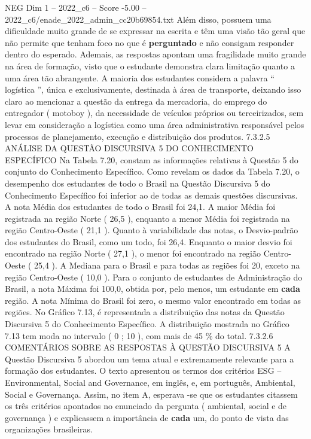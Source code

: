 \begin{textsample}{NEG Dim 1 – 2022\_c6 – Score -5.00 – 2022\_c6/enade\_2022\_admin\_cc20b69854.txt}
Além disso, possuem uma dificuldade muito grande de se expressar na escrita e têm uma visão tão geral que não permite que tenham foco no que é \textbf{perguntado} e não consigam responder dentro do esperado.
Ademais, as respostas apontam uma fragilidade muito grande na área de formação, visto que o estudante demonstra clara limitação quanto a uma área tão abrangente.
A maioria dos estudantes considera a palavra “ logística ”, única e exclusivamente, destinada à área de transporte, deixando isso claro ao mencionar a questão da entrega da mercadoria, do emprego do entregador ( motoboy ), da necessidade de veículos próprios ou terceirizados, sem levar em consideração a logística como uma área administrativa responsável pelos processos de planejamento, execução e distribuição dos produtos. 7.3.2.5 ANÁLISE DA QUESTÃO DISCURSIVA 5 DO CONHECIMENTO ESPECÍFICO Na Tabela 7.20, constam as informações relativas à Questão 5 do conjunto do Conhecimento Específico.
Como revelam os dados da Tabela 7.20, o desempenho dos estudantes de todo o Brasil na Questão Discursiva 5 do Conhecimento Específico foi inferior ao de todas as demais questões discursivas.
A nota Média dos estudantes de todo o Brasil foi 24,1.
A maior Média foi registrada na região Norte ( 26,5 ), enquanto a menor Média foi registrada na região Centro-Oeste ( 21,1 ).
Quanto à variabilidade das notas, o Desvio-padrão dos estudantes do Brasil, como um todo, foi 26,4.
Enquanto o maior desvio foi encontrado na região Norte ( 27,1 ), o menor foi encontrado na região Centro-Oeste ( 25,4 ).
A Mediana para o Brasil e para todas as regiões foi 20, exceto na região Centro-Oeste ( 10,0 ).
Para o conjunto de estudantes de Administração do Brasil, a nota Máxima foi 100,0, obtida por, pelo menos, um estudante em \textbf{cada} região.
A nota Mínima do Brasil foi zero, o mesmo valor encontrado em todas as regiões.
No Gráfico 7.13, é representada a distribuição das notas da Questão Discursiva 5 do Conhecimento Específico.
A distribuição mostrada no Gráfico 7.13 tem moda no intervalo ( 0 ; 10 ), com mais de 45 \% do total. 7.3.2.6 COMENTÁRIOS SOBRE AS RESPOSTAS À QUESTÃO DISCURSIVA 5 A Questão Discursiva 5 abordou um tema atual e extremamente relevante para a formação dos estudantes.
O texto apresentou os termos dos critérios ESG – Environmental, Social and Governance, em inglês, e, em português, Ambiental, Social e Governança.
Assim, no item A, esperava -se que os estudantes citassem os três critérios apontados no enunciado da pergunta ( ambiental, social e de governança ) e explicassem a importância de \textbf{cada} um, do ponto de vista das organizações brasileiras.

\end{textsample}
